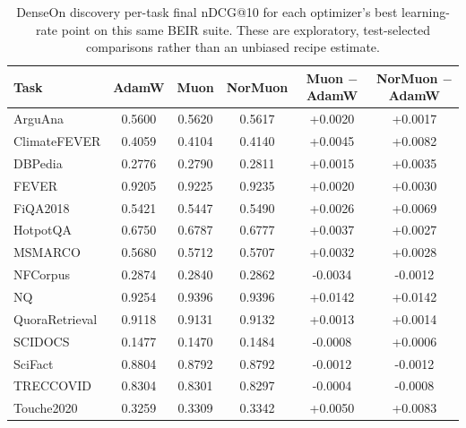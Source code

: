 \begin{table}[t]
\centering
\small
\begin{tabular}{lccccc}
\toprule
Task & AdamW & Muon & NorMuon & Muon $-$ AdamW & NorMuon $-$ AdamW \\
\midrule
ArguAna & 0.5600 & 0.5620 & 0.5617 & +0.0020 & +0.0017 \\
ClimateFEVER & 0.4059 & 0.4104 & 0.4140 & +0.0045 & +0.0082 \\
DBPedia & 0.2776 & 0.2790 & 0.2811 & +0.0015 & +0.0035 \\
FEVER & 0.9205 & 0.9225 & 0.9235 & +0.0020 & +0.0030 \\
FiQA2018 & 0.5421 & 0.5447 & 0.5490 & +0.0026 & +0.0069 \\
HotpotQA & 0.6750 & 0.6787 & 0.6777 & +0.0037 & +0.0027 \\
MSMARCO & 0.5680 & 0.5712 & 0.5707 & +0.0032 & +0.0028 \\
NFCorpus & 0.2874 & 0.2840 & 0.2862 & -0.0034 & -0.0012 \\
NQ & 0.9254 & 0.9396 & 0.9396 & +0.0142 & +0.0142 \\
QuoraRetrieval & 0.9118 & 0.9131 & 0.9132 & +0.0013 & +0.0014 \\
SCIDOCS & 0.1477 & 0.1470 & 0.1484 & -0.0008 & +0.0006 \\
SciFact & 0.8804 & 0.8792 & 0.8792 & -0.0012 & -0.0012 \\
TRECCOVID & 0.8304 & 0.8301 & 0.8297 & -0.0004 & -0.0008 \\
Touche2020 & 0.3259 & 0.3309 & 0.3342 & +0.0050 & +0.0083 \\
\bottomrule
\end{tabular}
\caption{DenseOn discovery per-task final nDCG@10 for each optimizer's best learning-rate point on this same BEIR suite. These are exploratory, test-selected comparisons rather than an unbiased recipe estimate.}
\label{tab:denseon-per-task-results}
\end{table}

